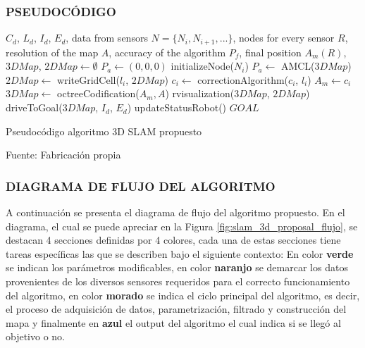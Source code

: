 \subsubsection{PSEUDOCÓDIGO}

\begin{algorithm}[H]
\centering
    \begin{algorithmic}[1]
        \Require $C_{d}$, $L_{d}$, $I_{d}$, $E_{d}$, data from sensors
        \Require $N = \{N_i, N_{i+1}, ...\}$, nodes for every sensor
        \Require $R$, resolution of the map
        \Require $A$, accuracy of the algorithm
        \Require $P_{f}$, final position
        \vspace{1mm}
        \hline
        \vspace{1mm}
        \State $A_{m}(R)$, $3DMap$, $2DMap  \leftarrow \emptyset$
        \State $P_a \leftarrow (0,0,0)$
            \State initializeNode($N_i$)
        \EndFor
            \State $P_{a} \leftarrow $ AMCL($3DMap$)
                \State $2DMap  \leftarrow$ writeGridCell($l_{i}$, $2DMap$)
                \State $c_i \leftarrow$ correctionAlgorithm($c_i$, $l_i$) 
                    \State $A_{m} \leftarrow c_i$
               \EndIf
            \EndFor
            \State $3DMap \leftarrow$ octreeCodification($A_{m}, A$) 
            \State rvisualization($3DMap$, $2DMap$)
                \State driveToGoal($3DMap$, $I_d$, $E_{d}$)
                \State updateStatusRobot()
            \Else
                \State \Return $GOAL$
            \EndIf
        \EndWhile
    \vspace{1mm}
    \hline
    \vspace{1mm}
    \end{algorithmic}
\caption{Pseudocódigo algoritmo 3D SLAM propuesto}
Fuente: Fabricación propia
\label{alg:Algoritmo 3DSLAM propuesto}
\end{algorithm}

\subsubsection{DIAGRAMA DE FLUJO DEL ALGORITMO}

A continuación se presenta el diagrama de flujo del algoritmo propuesto. En el diagrama, el cual se puede apreciar en la Figura \ref{fig:slam_3d_proposal_flujo}, se destacan 4 secciones definidas por 4 colores, cada una de estas secciones tiene tareas específicas las que se describen bajo el siguiente contexto: En color \textbf{verde} se indican los parámetros modificables, en color \textbf{naranjo} se demarcar los datos provenientes de los diversos sensores requeridos para el correcto funcionamiento del algoritmo, en color \textbf{morado} se indica el ciclo principal del algoritmo, es decir, el proceso de adquisición de datos, parametrización, filtrado y construcción del mapa y finalmente en \textbf{azul} el output del algoritmo el cual indica si se llegó al objetivo o no.

